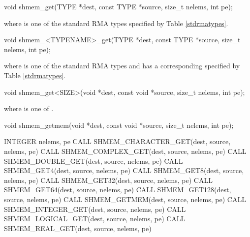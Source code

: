 
\begin{apidefinition}

\begin{C11synopsis}
void shmem_get(TYPE *dest, const TYPE *source, size_t nelems, int pe);
\end{C11synopsis}
where \TYPE{} is one of the standard \ac{RMA} types specified by Table \ref{stdrmatypes}.

\begin{Csynopsis}
void shmem_<TYPENAME>_get(TYPE *dest, const TYPE *source, size_t nelems, int pe);
\end{Csynopsis}
where \TYPE{} is one of the standard \ac{RMA} types and has a corresponding \TYPENAME{} specified by Table \ref{stdrmatypes}.

\begin{CsynopsisCol}
void shmem_get<SIZE>(void *dest, const void *source, size_t  nelems, int pe);
\end{CsynopsisCol}
where \SIZE{} is one of .

\begin{CsynopsisCol}
void shmem_getmem(void *dest, const void *source, size_t nelems, int pe);
\end{CsynopsisCol}

\begin{Fsynopsis}
INTEGER nelems, pe
CALL SHMEM_CHARACTER_GET(dest, source, nelems, pe)
CALL SHMEM_COMPLEX_GET(dest, source, nelems, pe)
CALL SHMEM_DOUBLE_GET(dest, source, nelems, pe)
CALL SHMEM_GET4(dest, source, nelems, pe)
CALL SHMEM_GET8(dest, source, nelems, pe)
CALL SHMEM_GET32(dest, source, nelems, pe)
CALL SHMEM_GET64(dest, source, nelems, pe)
CALL SHMEM_GET128(dest, source, nelems, pe)
CALL SHMEM_GETMEM(dest, source, nelems, pe)
CALL SHMEM_INTEGER_GET(dest, source, nelems, pe)
CALL SHMEM_LOGICAL_GET(dest, source, nelems, pe)
CALL SHMEM_REAL_GET(dest, source, nelems, pe)
\end{Fsynopsis}

\begin{apiarguments}
\end{apiarguments}


\end{apidefinition}
